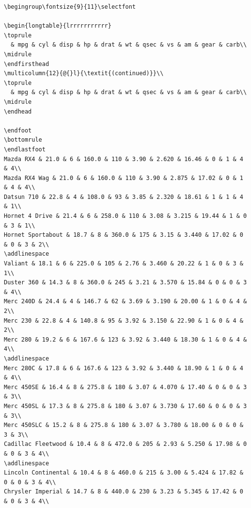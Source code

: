 \documentclass[a4paper, nobind]{templates/ociamthesis}
\begin{document}
\begin{verbatim}
\begingroup\fontsize{9}{11}\selectfont

\begin{longtable}{lrrrrrrrrrrr}
\toprule
  & mpg & cyl & disp & hp & drat & wt & qsec & vs & am & gear & carb\\
\midrule
\endfirsthead
\multicolumn{12}{@{}l}{\textit{(continued)}}\\
\toprule
  & mpg & cyl & disp & hp & drat & wt & qsec & vs & am & gear & carb\\
\midrule
\endhead

\endfoot
\bottomrule
\endlastfoot
Mazda RX4 & 21.0 & 6 & 160.0 & 110 & 3.90 & 2.620 & 16.46 & 0 & 1 & 4 & 4\\
Mazda RX4 Wag & 21.0 & 6 & 160.0 & 110 & 3.90 & 2.875 & 17.02 & 0 & 1 & 4 & 4\\
Datsun 710 & 22.8 & 4 & 108.0 & 93 & 3.85 & 2.320 & 18.61 & 1 & 1 & 4 & 1\\
Hornet 4 Drive & 21.4 & 6 & 258.0 & 110 & 3.08 & 3.215 & 19.44 & 1 & 0 & 3 & 1\\
Hornet Sportabout & 18.7 & 8 & 360.0 & 175 & 3.15 & 3.440 & 17.02 & 0 & 0 & 3 & 2\\
\addlinespace
Valiant & 18.1 & 6 & 225.0 & 105 & 2.76 & 3.460 & 20.22 & 1 & 0 & 3 & 1\\
Duster 360 & 14.3 & 8 & 360.0 & 245 & 3.21 & 3.570 & 15.84 & 0 & 0 & 3 & 4\\
Merc 240D & 24.4 & 4 & 146.7 & 62 & 3.69 & 3.190 & 20.00 & 1 & 0 & 4 & 2\\
Merc 230 & 22.8 & 4 & 140.8 & 95 & 3.92 & 3.150 & 22.90 & 1 & 0 & 4 & 2\\
Merc 280 & 19.2 & 6 & 167.6 & 123 & 3.92 & 3.440 & 18.30 & 1 & 0 & 4 & 4\\
\addlinespace
Merc 280C & 17.8 & 6 & 167.6 & 123 & 3.92 & 3.440 & 18.90 & 1 & 0 & 4 & 4\\
Merc 450SE & 16.4 & 8 & 275.8 & 180 & 3.07 & 4.070 & 17.40 & 0 & 0 & 3 & 3\\
Merc 450SL & 17.3 & 8 & 275.8 & 180 & 3.07 & 3.730 & 17.60 & 0 & 0 & 3 & 3\\
Merc 450SLC & 15.2 & 8 & 275.8 & 180 & 3.07 & 3.780 & 18.00 & 0 & 0 & 3 & 3\\
Cadillac Fleetwood & 10.4 & 8 & 472.0 & 205 & 2.93 & 5.250 & 17.98 & 0 & 0 & 3 & 4\\
\addlinespace
Lincoln Continental & 10.4 & 8 & 460.0 & 215 & 3.00 & 5.424 & 17.82 & 0 & 0 & 3 & 4\\
Chrysler Imperial & 14.7 & 8 & 440.0 & 230 & 3.23 & 5.345 & 17.42 & 0 & 0 & 3 & 4\\

\end{verbatim}
\end{document}
